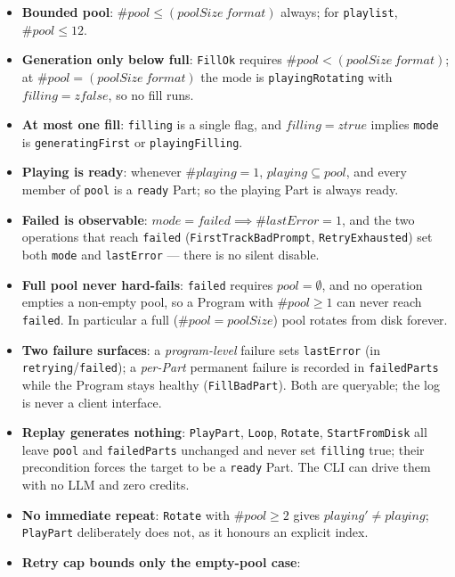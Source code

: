 \documentclass[a4paper,10pt,fleqn]{article}
\begin{document}
\begin{itemize}
  \item \textbf{Bounded pool}: $\# pool \leq (poolSize~format)$ always; for
    \texttt{playlist}, $\# pool \leq 12$.
  \item \textbf{Generation only below full}: \texttt{FillOk} requires
    $\# pool < (poolSize~format)$; at $\# pool = (poolSize~format)$ the mode is
    \texttt{playingRotating} with $filling = zfalse$, so no fill runs.
  \item \textbf{At most one fill}: \texttt{filling} is a single flag, and
    $filling = ztrue$ implies \texttt{mode} is \texttt{generatingFirst} or
    \texttt{playingFilling}.
  \item \textbf{Playing is ready}: whenever $\# playing = 1$,
    $playing \subseteq pool$, and every member of \texttt{pool} is a
    \texttt{ready} Part; so the playing Part is always ready.
  \item \textbf{Failed is observable}: $mode = failed \implies \# lastError = 1$,
    and the two operations that reach \texttt{failed}
    (\texttt{FirstTrackBadPrompt}, \texttt{RetryExhausted}) set both
    \texttt{mode} and \texttt{lastError} --- there is no silent disable.
  \item \textbf{Full pool never hard-fails}: \texttt{failed} requires
    $pool = \emptyset$, and no operation empties a non-empty pool, so a
    Program with $\# pool \geq 1$ can never reach \texttt{failed}. In
    particular a full ($\# pool = poolSize$) pool rotates from disk forever.
  \item \textbf{Two failure surfaces}: a \emph{program-level} failure sets
    \texttt{lastError} (in \texttt{retrying}/\texttt{failed}); a
    \emph{per-Part} permanent failure is recorded in \texttt{failedParts} while
    the Program stays healthy (\texttt{FillBadPart}). Both are queryable; the
    log is never a client interface.
  \item \textbf{Replay generates nothing}: \texttt{PlayPart}, \texttt{Loop},
    \texttt{Rotate}, \texttt{StartFromDisk} all leave \texttt{pool} and
    \texttt{failedParts} unchanged and never set \texttt{filling} true; their
    precondition forces the target to be a \texttt{ready} Part. The CLI can
    drive them with no LLM and zero credits.
  \item \textbf{No immediate repeat}: \texttt{Rotate} with $\# pool \geq 2$
    gives $playing' \neq playing$; \texttt{PlayPart} deliberately does not, as
    it honours an explicit index.
  \item \textbf{Retry cap bounds only the empty-pool case}:

\end{itemize}
\end{document}
